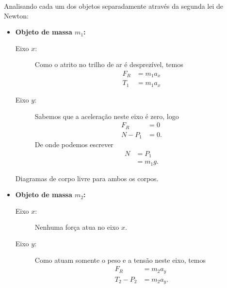 Analisando cada um dos objetos separadamente através da segunda lei de Newton:
\begin{itemize}
\item\textbf{Objeto de massa $m_1$:}
\begin{description}
	\item[Eixo $x$:] Como o atrito no trilho de ar é desprezível, temos
		\begin{align}
			F_R &= m_1 a_x \\
			T_1 &= m_1 a_x
		\end{align}
	\item[Eixo $y$:] Sabemos que a aceleração neste eixo é zero, logo
		\begin{align}
			F_R &= 0 \\
			N - P_1 &= 0.
		\end{align}
\noindent{}De onde podemos escrever
		\begin{align}
			N &= P_1 \\
			  &= m_1 g.
		\end{align}
\end{description}

\begin{marginfigure}
\caption{Diagramas de corpo livre para ambos os corpos.}
\end{marginfigure}

\item\textbf{Objeto de massa $m_2$:}
\begin{description}
	\item[Eixo $x$:] Nenhuma força atua no eixo $x$.
	\item[Eixo $y$:] Como atuam somente o peso e a tensão neste eixo, temos
		\begin{align}
			F_R &= m_2 a_y \\
			T_2 - P_2 &= m_2 a_y.
		\end{align}
\end{description}
\end{itemize}

